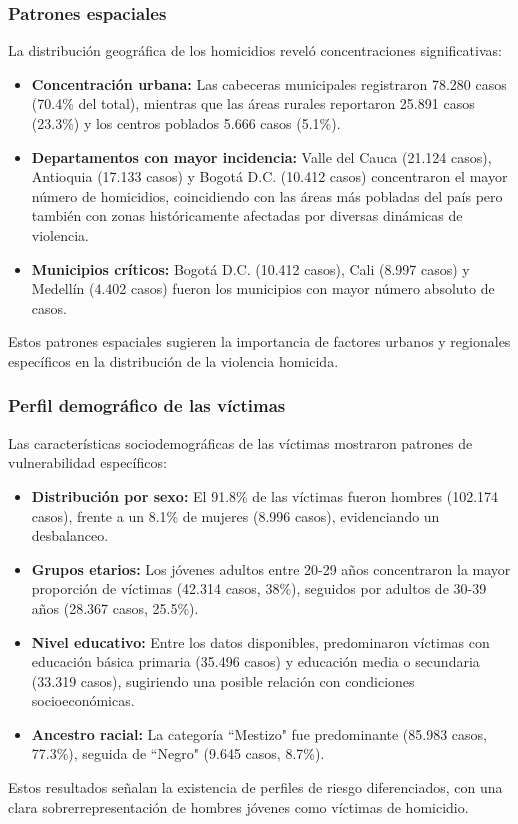 \documentclass[lettersize,journal]{IEEEtran}
\begin{document}
\subsubsection{Patrones espaciales}
La distribución geográfica de los homicidios reveló concentraciones significativas:
\begin{itemize}
\item \textbf{Concentración urbana:} Las cabeceras municipales registraron 78.280 casos (70.4\% del total), mientras que las áreas rurales reportaron 25.891 casos (23.3\%) y los centros poblados 5.666 casos (5.1\%).
\item \textbf{Departamentos con mayor incidencia:} Valle del Cauca (21.124 casos), Antioquia (17.133 casos) y Bogotá D.C. (10.412 casos) concentraron el mayor número de homicidios, coincidiendo con las áreas más pobladas del país pero también con zonas históricamente afectadas por diversas dinámicas de violencia.
\item \textbf{Municipios críticos:} Bogotá D.C. (10.412 casos), Cali (8.997 casos) y Medellín (4.402 casos) fueron los municipios con mayor número absoluto de casos.
\end{itemize}
Estos patrones espaciales sugieren la importancia de factores urbanos y regionales específicos en la distribución de la violencia homicida.
\subsubsection{Perfil demográfico de las víctimas}
Las características sociodemográficas de las víctimas mostraron patrones de vulnerabilidad específicos:
\begin{itemize}
\item \textbf{Distribución por sexo:} El 91.8\% de las víctimas fueron hombres (102.174 casos), frente a un 8.1\% de mujeres (8.996 casos), evidenciando un desbalanceo.
\item \textbf{Grupos etarios:} Los jóvenes adultos entre 20-29 años concentraron la mayor proporción de víctimas (42.314 casos, 38\%), seguidos por adultos de 30-39 años (28.367 casos, 25.5\%).
\item \textbf{Nivel educativo:} Entre los datos disponibles, predominaron víctimas con educación básica primaria (35.496 casos) y educación media o secundaria (33.319 casos), sugiriendo una posible relación con condiciones socioeconómicas.
\item \textbf{Ancestro racial:} La categoría ``Mestizo" fue predominante (85.983 casos, 77.3\%), seguida de ``Negro" (9.645 casos, 8.7\%).
\end{itemize}
Estos resultados señalan la existencia de perfiles de riesgo diferenciados, con una clara sobrerrepresentación de hombres jóvenes como víctimas de homicidio.
\end{document}

